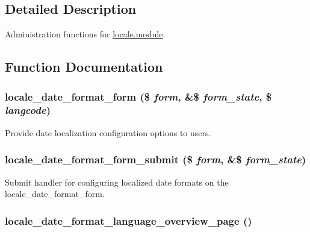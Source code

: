 \subsection{Detailed Description}
Administration functions for \hyperlink{locale_8module}{locale.module}. 

\subsection{Function Documentation}
\hypertarget{locale_8admin_8inc_a18cccc28c9fb6a7434ca4666e1947046}{
\subsubsection[{locale\_\-date\_\-format\_\-form}]{\setlength{\rightskip}{0pt plus 5cm}locale\_\-date\_\-format\_\-form (\$ {\em form}, \/  \&\$ {\em form\_\-state}, \/  \$ {\em langcode})}}
\label{locale_8admin_8inc_a18cccc28c9fb6a7434ca4666e1947046}
Provide date localization configuration options to users. \hypertarget{locale_8admin_8inc_af64d7f28aed68b090c0fa48cb5f260f7}{
\subsubsection[{locale\_\-date\_\-format\_\-form\_\-submit}]{\setlength{\rightskip}{0pt plus 5cm}locale\_\-date\_\-format\_\-form\_\-submit (\$ {\em form}, \/  \&\$ {\em form\_\-state})}}
\label{locale_8admin_8inc_af64d7f28aed68b090c0fa48cb5f260f7}
Submit handler for configuring localized date formats on the locale\_\-date\_\-format\_\-form. \hypertarget{locale_8admin_8inc_a35d0afd550f384a5737479375ba6ada1}{
\subsubsection[{locale\_\-date\_\-format\_\-language\_\-overview\_\-page}]{\setlength{\rightskip}{0pt plus 5cm}locale\_\-date\_\-format\_\-language\_\-overview\_\-page ()}}
